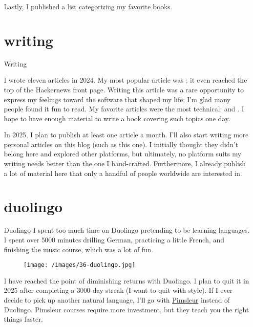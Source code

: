 \documentclass{article}
\begin{document}
Lastly, I published a \href{https://github.com/roman-kashitsyn/my-favorite-things}{list categorizing my favorite books}.

\section{writing}{Writing}

I wrote eleven articles in 2024.
My most popular article was ; it even reached the top of the Hackernews front page.
Writing this article was a rare opportunity to express my feelings toward the software that shaped my life; I’m glad many people found it fun to read.
My favorite articles were the most technical:  and .
I hope to have enough material to write a book covering such topics one day.

In 2025, I plan to publish at least one article a month.
I'll also start writing more personal articles on this blog (such as this one).
I initially thought they didn't belong here and explored other platforms, but ultimately, no platform suits my writing needs better than the one I hand-crafted.
Furthermore, I already publish a lot of material here that only a handful of people worldwide are interested in.

\section{duolingo}{Duolingo}
I spent too much time on Duolingo pretending to be learning languages.
I spent over 5000 minutes drilling German, practicing a little French, and finishing the music course, which was a lot of fun.

\begin{figure}[medium-size,center]
\texttt{[image: /images/36-duolingo.jpg]}
\end{figure}

I have reached the point of diminishing returns with Duolingo.
I plan to quit it in 2025 after completing a 3000-day streak (I want to quit with style).
If I ever decide to pick up another natural language, I’ll go with \href{https://www.pimsleur.com/}{Pimsleur} instead of Duolingo.
Pimsleur courses require more investment, but they teach you the right things faster.
\end{document}
